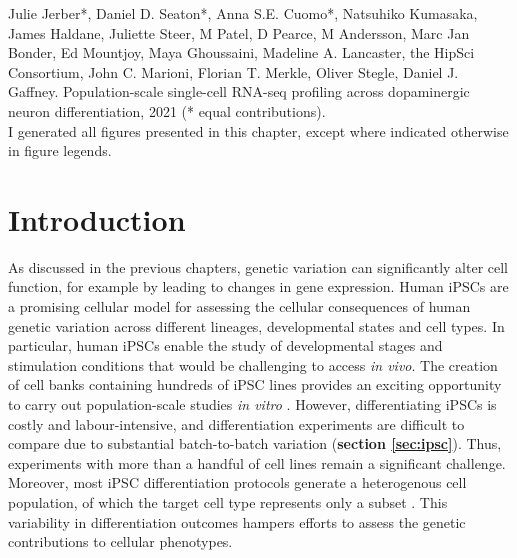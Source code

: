 \begin{Comment2}
Julie Jerber*, Daniel D. Seaton*, Anna S.E. Cuomo*, Natsuhiko Kumasaka, James Haldane, Juliette Steer, M Patel, D Pearce, M Andersson, Marc Jan Bonder, Ed Mountjoy, Maya Ghoussaini, Madeline A. Lancaster, the HipSci Consortium, John C. Marioni, Florian T. Merkle, Oliver Stegle, Daniel J. Gaffney. Population-scale single-cell RNA-seq profiling across dopaminergic neuron differentiation, 2021 (* equal contributions). \\

I generated all figures presented in this chapter, except where indicated otherwise in figure legends. 

\end{Comment2}

\newpage

\section{Introduction}
\label{sec:neuroseq_intro}

As discussed in the previous chapters, genetic variation can significantly alter cell function, for example by leading to changes in gene expression. 
Human iPSCs are a promising cellular model for assessing the cellular consequences of human genetic variation across different lineages, developmental states and cell types. 
In particular, human iPSCs enable the study of developmental stages and stimulation conditions that would be challenging to access \textit{in vivo}. 
The creation of cell banks containing hundreds of iPSC lines \cite{kilpinen2017common} provides an exciting opportunity to carry out population-scale studies \textit{in vitro} \cite{cuomo2020single, strober2019dynamic, schwartzentruber2018molecular, alasoo2018shared}.
However, differentiating iPSCs is costly and labour-intensive, and differentiation experiments are difficult to compare due to substantial batch-to-batch variation (\textbf{section 
\ref{sec:ipsc}}).
Thus, experiments with more than a handful of cell lines remain a significant challenge.
Moreover, most iPSC differentiation protocols generate a heterogenous cell population, of which the target cell type represents only a subset \cite{d2019vitro, banovich2018impact, volpato2018reproducibility, nguyen2018single}. 
This variability in differentiation outcomes hampers efforts to assess the genetic contributions to cellular phenotypes.\\

